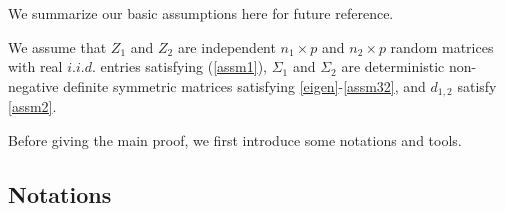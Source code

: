 \documentclass{article}
\begin{document}
We summarize our basic assumptions here for future reference.
\begin{assumption}\label{assm_big1}
We assume that $Z_1$ and $Z_2$ are independent $n_1\times p$ and $n_2\times p$ random matrices with real $i.i.d.$ entries satisfying (\ref{assm1}), $\Sigma_1$ and $\Sigma_2$ are deterministic non-negative definite symmetric matrices satisfying \eqref{eigen}-\eqref{assm32}, and $d_{1,2}$ satisfy \eqref{assm2}.
\end{assumption}


Before giving the main proof, we first introduce some notations and tools. 


\subsection{Notations}

%
\end{document}
